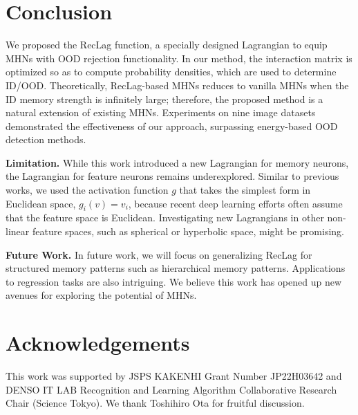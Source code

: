 
\section{Conclusion}
We proposed the RecLag function, a specially designed Lagrangian
to equip MHNs with OOD rejection functionality.
In our method, the interaction matrix is optimized so as to compute probability densities, which are used to determine ID/OOD.
Theoretically, RecLag-based MHNs reduces to vanilla MHNs when the ID memory strength is infinitely large; therefore, the proposed method is a natural extension of existing MHNs.
Experiments on nine image datasets demonstrated the effectiveness of our approach, surpassing energy-based OOD detection methods. 

\noindent \textbf{Limitation.}
While this work introduced a new Lagrangian for memory neurons, the Lagrangian for feature neurons remains underexplored. Similar to previous works, we used the activation function $g$ that takes the simplest form in Euclidean space, $g_{i}(v) =v_{i}$, because recent deep learning efforts often assume that the feature space is Euclidean.
Investigating new Lagrangians in other non-linear feature spaces, such as spherical or hyperbolic space, might be promising.

\noindent \textbf{Future Work.}
In future work, we will focus on generalizing RecLag for structured memory patterns such as hierarchical memory patterns. Applications to regression tasks are also intriguing.
We believe this work has opened up new avenues for exploring the potential of MHNs.

\section*{Acknowledgements}
This work was supported by JSPS KAKENHI Grant Number JP22H03642 and DENSO IT LAB Recognition and Learning Algorithm Collaborative Research Chair (Science Tokyo).
We thank Toshihiro Ota for fruitful discussion.
